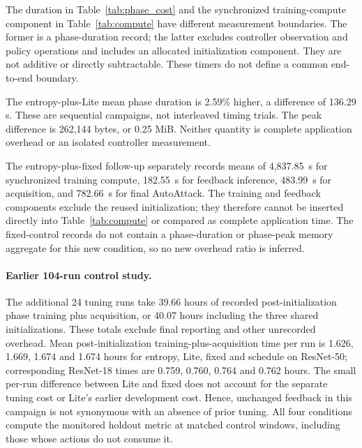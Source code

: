 \documentclass[10pt,a4paper,twocolumn]{article}
\begin{document}
The duration in Table~\ref{tab:phase_cost} and the synchronized
training-compute component in Table~\ref{tab:compute} have different
measurement boundaries. The former is a phase-duration record; the
latter excludes controller observation and policy operations and includes
an allocated initialization component. They are not additive or directly
subtractable. These timers do not define a common end-to-end boundary.

The entropy-plus-Lite mean phase duration is 2.59\% higher,
a difference of 136.29 s. These are sequential campaigns,
not interleaved timing trials.
The peak difference is 262,144 bytes, or 0.25 MiB.
Neither quantity is complete application overhead or
an isolated controller measurement.


The entropy-plus-fixed follow-up separately records means of 4,837.85~s
for synchronized training compute, 182.55~s for feedback inference,
483.99~s for acquisition, and 782.66~s for final AutoAttack.
The training and feedback components exclude the reused initialization;
they therefore cannot be inserted directly into Table~\ref{tab:compute}
or compared as complete application time. The fixed-control records do not contain a phase-duration or phase-peak memory aggregate for this
new condition, so no new overhead ratio is inferred.

\paragraph{Earlier 104-run control study.}
The additional 24 tuning runs take 39.66 hours of recorded
post-initialization phase training plus acquisition, or 40.07 hours
including the three shared initializations. These totals exclude final
reporting and other unrecorded overhead. Mean post-initialization
training-plus-acquisition time per run is 1.626, 1.669, 1.674 and
1.674 hours for entropy, Lite, fixed and schedule on ResNet-50;
corresponding ResNet-18 times are 0.759, 0.760, 0.764 and 0.762 hours.
The small per-run difference between Lite and fixed does not account
for the separate tuning cost or Lite's earlier development cost.
Hence, unchanged feedback in this campaign is not synonymous with
an absence of prior tuning. All four conditions compute the monitored
holdout metric at matched control windows, including those whose
actions do not consume it.
\end{document}
